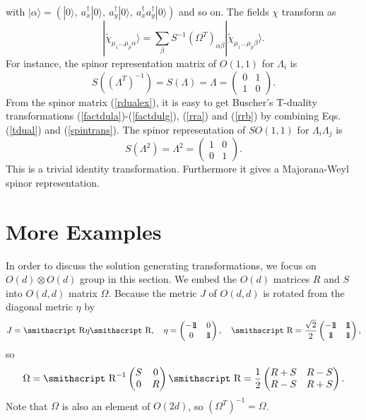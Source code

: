 \documentclass[a4paper,12pt]{article}
\newcommand{\mathst}[1]{\mbox{\smithscript #1}}
\begin{document}
with $|\alpha\rangle=(|0\rangle,\ a_x^\dag|0\rangle,\ 
a_y^\dag|0\rangle,\ a_x^\dag a_y^\dag|0\rangle)$ and so on.
The fields $\chi$ transform as 
\begin{equation}
\label{spintrans}
|{\tilde \chi}_{\mu_1\dots\mu_p\alpha}\rangle
=\sum_\beta S^{-1}(\Omega^T)_{\alpha\beta}
|{\tilde \chi}_{\mu_1\dots\mu_p\beta}\rangle.
\end{equation}
For instance, the spinor representation matrix
of $O(1,1)$  for $\Lambda_i$ is
\begin{equation}
\label{rdualex}
S\left((\Lambda^T)^{-1}\right)=S(\Lambda)
=\Lambda=\begin{pmatrix}
0 & 1\\
1 & 0
\end{pmatrix}.
\end{equation}
From the spinor matrix (\ref{rdualex}), it is easy to
get Buscher's T-duality transformations
(\ref{factdula})-(\ref{factdulg}), (\ref{rra})
and (\ref{rrb}) by combining Eqs. (\ref{tdual}) and
(\ref{spintrans}). The spinor representation of $SO(1,1)$
for $\Lambda_i\Lambda_j$ is
\begin{equation}
\label{rdualex1}
S(\Lambda^2)=\Lambda^2=\begin{pmatrix}
1 & 0\\
0 & 1
\end{pmatrix}.
\end{equation}
This is a trivial identity transformation. Furthermore
it gives a Majorana-Weyl spinor representation.

\section{More Examples}

In order to discuss the solution generating transformations,
we focus on $O(d)\otimes O(d)$ group in this section.
We embed the $O(d)$ matrices $R$ and $S$
into $O(d,d)$ matrix $\Omega$.
Because the metric $J$ of $O(d,d)$ 
is rotated from the diagonal metric $\eta$ by
$$J={\mathst R}\eta {\mathst R},\quad
\eta=\begin{pmatrix}
-1\!\!1 & 0\\
0 & 1\!\!1
\end{pmatrix},\quad
{\mathst R}={\sqrt{2}\over 2}
\begin{pmatrix}
-1\!\!1 & 1\!\!1\\
1\!\!1  & 1\!\!1
\end{pmatrix},$$
so
$$\Omega={\mathst R}^{-1}\begin{pmatrix}
S & 0\\
0 & R
\end{pmatrix}{\mathst R}={1\over 2}\begin{pmatrix}
R+S & R-S\\
R-S & R+S
\end{pmatrix}.$$
Note that $\Omega$ is also an element of $O(2d)$, so
$(\Omega^T)^{-1}=\Omega$.
\end{document}
